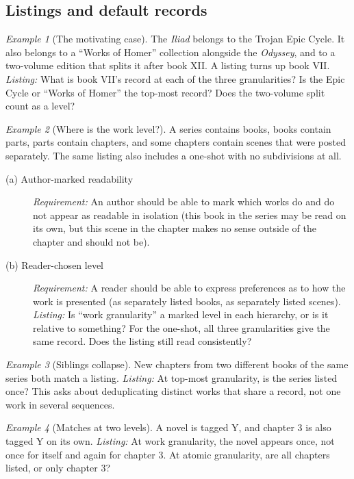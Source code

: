 \documentclass{amsart}
\theoremstyle{remark}
\newtheorem{eg}{Example}
\begin{document}
    \subsection*{Listings and default records}
    \begin{eg}[The motivating case]\label{eg:iliad}
        The \textit{Iliad} belongs to the Trojan Epic Cycle. It also belongs to a ``Works of Homer'' collection alongside the \textit{Odyssey}, and to a two-volume edition that splits it after book XII. A listing turns up book VII.
        \emph{Listing:} What is book VII's record at each of the three granularities? Is the Epic Cycle or ``Works of Homer'' the top-most record? Does the two-volume split count as a level?
    \end{eg}
    \begin{eg}[Where is the work level?]\label{eg:work-level}
        A series contains books, books contain parts, parts contain chapters, and some chapters contain scenes that were posted separately. The same listing also includes a one-shot with no subdivisions at all.
        \begin{description}
          \item[(a) Author-marked readability] \emph{Requirement:} An author should be able to mark which works do and do not appear as readable in isolation (this book in the series may be read on its own, but this scene in the chapter makes no sense outside of the chapter and should not be).
          \item[(b) Reader-chosen level] \emph{Requirement:} A reader should be able to express preferences as to how the work is presented (as separately listed books, as separately listed scenes).
          \emph{Listing:} Is ``work granularity'' a marked level in each hierarchy, or is it relative to something? For the one-shot, all three granularities give the same record. Does the listing still read consistently?
        \end{description}
    \end{eg}
    \begin{eg}[Siblings collapse]\label{eg:siblings}
        New chapters from two different books of the same series both match a listing.
        \emph{Listing:} At top-most granularity, is the series listed once? This asks about deduplicating distinct works that share a record, not one work in several sequences.
    \end{eg}
    \begin{eg}[Matches at two levels]\label{eg:double-match}
        A novel is tagged Y, and chapter 3 is also tagged Y on its own.
        \emph{Listing:} At work granularity, the novel appears once, not once for itself and again for chapter 3. At atomic granularity, are all chapters listed, or only chapter 3?
    \end{eg}
\end{document}
